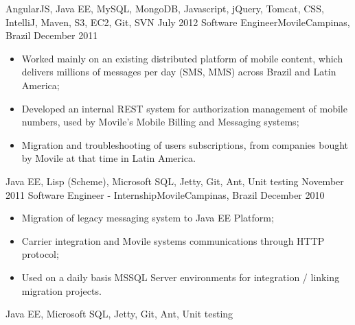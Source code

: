 \begin{experiences}
{    }{AngularJS, Java EE, MySQL, MongoDB, Javascript, jQuery, Tomcat, CSS, IntelliJ, Maven, S3, EC2, Git, SVN}
  \emptySeparator
  \experience
    {July 2012} {Software Engineer}{Movile}{Campinas, Brazil}
    {December 2011}    {
          \begin{itemize}
            \item Worked mainly on an existing distributed platform of mobile content, which delivers millions of
            messages per day (SMS, MMS) across Brazil and Latin America;
            \item Developed an internal REST system for authorization management of mobile numbers,
             used by Movile's Mobile Billing and Messaging systems;
            \item Migration and troubleshooting of users subscriptions, from companies bought by Movile at that time in Latin America.\\
          \end{itemize}
        }{Java EE, Lisp (Scheme), Microsoft SQL, Jetty, Git, Ant, Unit testing}
  \emptySeparator
  \experience
  {November 2011} {Software Engineer - Internship}{Movile}{Campinas, Brazil}
  {December 2010}
        {
          \begin{itemize}
            \item Migration of legacy messaging system to Java EE Platform;
            \item Carrier integration and Movile systems communications through HTTP protocol;
            \item Used on a daily basis MSSQL Server environments for integration / linking migration projects.\\
          \end{itemize}
        }{Java EE, Microsoft SQL, Jetty, Git, Ant, Unit testing}
\end{experiences}
